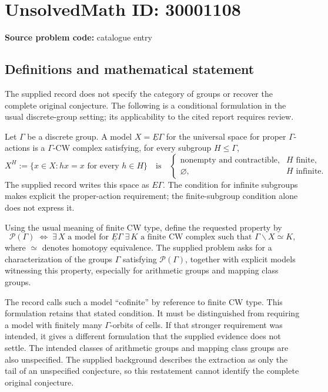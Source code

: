 \documentclass[11pt]{article}
\begin{document}
\section*{UnsolvedMath ID: 30001108}
\textbf{Source problem code:} catalogue entry
\subsection{Definitions and mathematical statement}
The supplied record does not specify the category of groups or recover the complete original conjecture. The following is a conditional formulation in the usual discrete-group setting; its applicability to the cited report requires review.

Let \(\Gamma\) be a discrete group. A model \(X=\underline{E}\Gamma\) for the universal space for proper \(\Gamma\)-actions is a \(\Gamma\)-CW complex satisfying, for every subgroup \(H\leq\Gamma\),
\[
X^H:=\{x\in X: hx=x\text{ for every }h\in H\}
\quad\text{is}\quad
\begin{cases}
\text{nonempty and contractible},& H\text{ finite},\\
\varnothing,& H\text{ infinite}.
\end{cases}
\]
The supplied record writes this space as \(E\Gamma\). The condition for infinite subgroups makes explicit the proper-action requirement; the finite-subgroup condition alone does not express it.

Using the usual meaning of finite CW type, define the requested property by
\[
\mathcal P(\Gamma)\;\Longleftrightarrow\;
\exists\,X\text{ a model for }\underline{E}\Gamma\;
\exists\,K\text{ a finite CW complex such that }
\Gamma\backslash X\simeq K,
\]
where \(\simeq\) denotes homotopy equivalence. The supplied problem asks for a characterization of the groups \(\Gamma\) satisfying \(\mathcal P(\Gamma)\), together with explicit models witnessing this property, especially for arithmetic groups and mapping class groups.

The record calls such a model ``cofinite'' by reference to finite CW type. This formulation retains that stated condition. It must be distinguished from requiring a model with finitely many \(\Gamma\)-orbits of cells. If that stronger requirement was intended, it gives a different formulation that the supplied evidence does not settle. The intended classes of arithmetic groups and mapping class groups are also unspecified. The supplied background describes the extraction as only the tail of an unspecified conjecture, so this restatement cannot identify the complete original conjecture.
\end{document}
